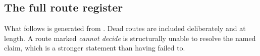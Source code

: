 \subsection{The full route register}

What follows is generated from . Dead routes are
included deliberately and at length. A route marked \emph{cannot decide}
is structurally unable to resolve the named claim, which is a stronger
statement than having failed to.

\medskip

